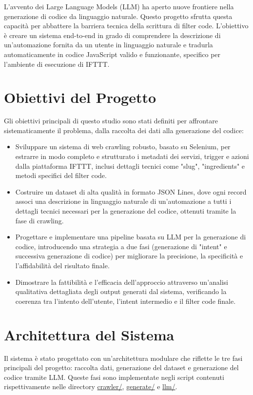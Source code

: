 \documentclass[sigconf,natbib=false]{acmart}
\begin{document}
L'avvento dei Large Language Models (LLM) ha aperto nuove frontiere nella generazione di codice da linguaggio naturale. Questo progetto sfrutta questa capacità per abbattere la barriera tecnica della scrittura di filter code. L'obiettivo è creare un sistema end-to-end in grado di comprendere la descrizione di un'automazione fornita da un utente in linguaggio naturale e tradurla automaticamente in codice JavaScript valido e funzionante, specifico per l'ambiente di esecuzione di IFTTT.

\section{Obiettivi del Progetto}
Gli obiettivi principali di questo studio sono stati definiti per affrontare sistematicamente il problema, dalla raccolta dei dati alla generazione del codice:
\begin{itemize}
  \item Sviluppare un sistema di web crawling robusto, basato su Selenium, per estrarre in modo completo e strutturato i metadati dei servizi, trigger e azioni dalla piattaforma IFTTT, inclusi dettagli tecnici come "slug", "ingredients" e metodi specifici del filter code.
  \item Costruire un dataset di alta qualità in formato JSON Lines, dove ogni record associ una descrizione in linguaggio naturale di un'automazione a tutti i dettagli tecnici necessari per la generazione del codice, ottenuti tramite la fase di crawling.
  \item Progettare e implementare una pipeline basata su LLM per la generazione di codice, introducendo una strategia a due fasi (generazione di "intent" e successiva generazione di codice) per migliorare la precisione, la specificità e l'affidabilità del risultato finale.
  \item Dimostrare la fattibilità e l'efficacia dell'approccio attraverso un'analisi qualitativa dettagliata degli output generati dal sistema, verificando la coerenza tra l'intento dell'utente, l'intent intermedio e il filter code finale.
\end{itemize}

\section{Architettura del Sistema}
Il sistema è stato progettato con un'architettura modulare che riflette le tre fasi principali del progetto: raccolta dati, generazione del dataset e generazione del codice tramite LLM. Queste fasi sono implementate negli script contenuti rispettivamente nelle directory \url{crawler/}, \url{generate/} e \url{llm/}.
\end{document}
